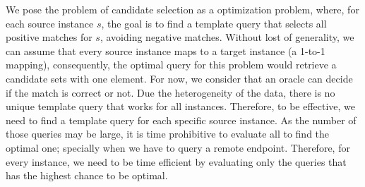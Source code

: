 We pose the problem of candidate selection as a optimization problem, where, for each source instance $s$, the goal is to find a template query that selects all positive matches for $s$, avoiding negative matches. Without lost of generality, we can assume that every source instance maps to a target instance (a 1-to-1 mapping), consequently, the optimal query for this problem would retrieve a candidate sets with one element. For now, we consider that an oracle can decide if the match is correct or not. Due the heterogeneity of the data, there is no unique template query that works for all instances. Therefore, to be effective, we need to find a template query for each specific source instance.  As the number of those queries may be large, it is time prohibitive to evaluate all to find the optimal one; specially when we have to query a remote endpoint. Therefore, for every instance, we need to be time efficient by evaluating only the queries that has the highest chance to be optimal.

 



